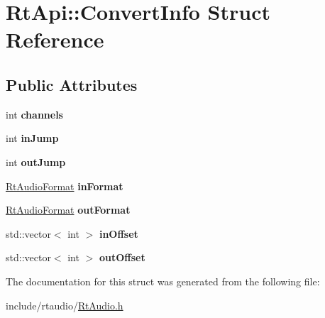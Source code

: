 \hypertarget{struct_rt_api_1_1_convert_info}{}\section{Rt\+Api\+:\+:Convert\+Info Struct Reference}
\label{struct_rt_api_1_1_convert_info}
\subsection*{Public Attributes}
\begin{DoxyCompactItemize}
\item 
int {\bfseries channels}\hypertarget{struct_rt_api_1_1_convert_info_ae6fdb3e6b6a3a4974b49ded33291678b}{}\label{struct_rt_api_1_1_convert_info_ae6fdb3e6b6a3a4974b49ded33291678b}

\item 
int {\bfseries in\+Jump}\hypertarget{struct_rt_api_1_1_convert_info_a4af72ecf20214d857c3a8e6190230840}{}\label{struct_rt_api_1_1_convert_info_a4af72ecf20214d857c3a8e6190230840}

\item 
int {\bfseries out\+Jump}\hypertarget{struct_rt_api_1_1_convert_info_acb0920de8188e4453daf37a080ff78f5}{}\label{struct_rt_api_1_1_convert_info_acb0920de8188e4453daf37a080ff78f5}

\item 
\hyperlink{_rt_audio_8h_aafca92882d25915560018873221e44b8}{Rt\+Audio\+Format} {\bfseries in\+Format}\hypertarget{struct_rt_api_1_1_convert_info_a44d9cf8d7c26ff60fed5d0274cf6d81a}{}\label{struct_rt_api_1_1_convert_info_a44d9cf8d7c26ff60fed5d0274cf6d81a}

\item 
\hyperlink{_rt_audio_8h_aafca92882d25915560018873221e44b8}{Rt\+Audio\+Format} {\bfseries out\+Format}\hypertarget{struct_rt_api_1_1_convert_info_a64970c900e1649a386f3df8254ef4aec}{}\label{struct_rt_api_1_1_convert_info_a64970c900e1649a386f3df8254ef4aec}

\item 
std\+::vector$<$ int $>$ {\bfseries in\+Offset}\hypertarget{struct_rt_api_1_1_convert_info_a5e3b0a93cd8bfbf62e275cf4de22bcc5}{}\label{struct_rt_api_1_1_convert_info_a5e3b0a93cd8bfbf62e275cf4de22bcc5}

\item 
std\+::vector$<$ int $>$ {\bfseries out\+Offset}\hypertarget{struct_rt_api_1_1_convert_info_afe1baae9554f14df0f5f90c3f2beadaa}{}\label{struct_rt_api_1_1_convert_info_afe1baae9554f14df0f5f90c3f2beadaa}

\end{DoxyCompactItemize}


The documentation for this struct was generated from the following file\+:\begin{DoxyCompactItemize}
\item 
include/rtaudio/\hyperlink{_rt_audio_8h}{Rt\+Audio.\+h}\end{DoxyCompactItemize}
